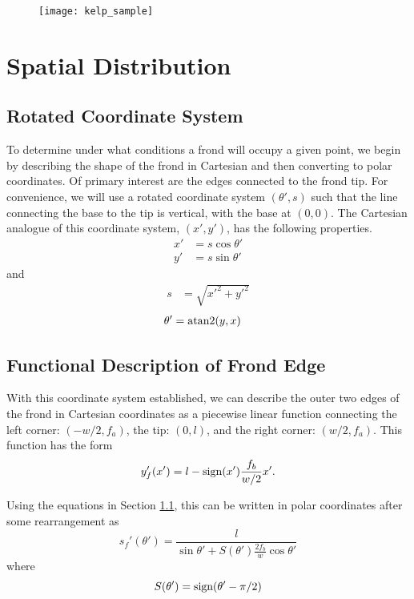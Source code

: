 \begin{figure}[h]
	\centering
	\texttt{[image: kelp\_sample]}
	\vspace{-2em}
	\label{fig:kelp_sample}
\end{figure}

\section{Spatial Distribution}
\subsection{Rotated Coordinate System}
\label{sec:rot_coords}
To determine under what conditions a frond will occupy a given point, we begin by
describing the shape of the frond in Cartesian and then converting to polar coordinates.
Of primary interest are the edges connected to the frond tip.
For convenience, we will use a rotated coordinate system $(\theta',s)$ such that the line connecting the base to the tip is vertical, with the base at $(0,0)$.
The Cartesian analogue of this coordinate system, $(x',y')$, has the following properties.
\begin{align}
	x' &= s\cos\theta' \\ 
	y' &= s\sin\theta'
\end{align}
and
\begin{align}
	s &= \sqrt{x'^2+y'^2}
\end{align}
\vspace{-1em}
\begin{align}
	\theta' &= \operatorname{atan2}(y, x)
\end{align}

\subsection{Functional Description of Frond Edge}
With this coordinate system established, we can describe the outer two edges of the frond in Cartesian coordinates as a piecewise linear function connecting the left corner: $(-w/2,f_a)$, the tip: $(0,l)$, and the right corner: $(w/2,f_a)$.
This function has the form
\begin{equation}
	y'_f(x') = l-\mbox{sign}(x')\frac{f_b}{w/2}x'.
\end{equation}

Using the equations in Section \ref{sec:rot_coords}, this can be written in polar coordinates after some rearrangement as
\begin{equation}
	s_f'(\theta') = \frac{l}{\sin\theta' + S(\theta')\frac{2f_b}{w}\cos\theta'}
\end{equation}
where
\begin{equation}
	S(\theta') = \mbox{sign}(\theta'-\pi/2)
\end{equation}

